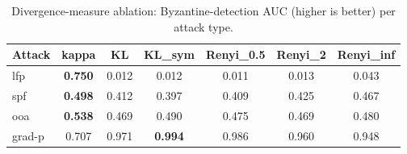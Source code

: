 \begin{table}[t]\centering\small
\caption{Divergence-measure ablation: Byzantine-detection AUC (higher is better) per attack type.}
\label{tab:divergence_ablation}
\begin{tabular}{lcccccc}
\toprule
Attack & kappa & KL & KL\_sym & Renyi\_0.5 & Renyi\_2 & Renyi\_inf \\
\midrule
lfp & \textbf{0.750} & 0.012 & 0.012 & 0.011 & 0.013 & 0.043 \\
spf & \textbf{0.498} & 0.412 & 0.397 & 0.409 & 0.425 & 0.467 \\
ooa & \textbf{0.538} & 0.469 & 0.490 & 0.475 & 0.469 & 0.480 \\
grad-p & 0.707 & 0.971 & \textbf{0.994} & 0.986 & 0.960 & 0.948 \\
\bottomrule
\end{tabular}
\end{table}
